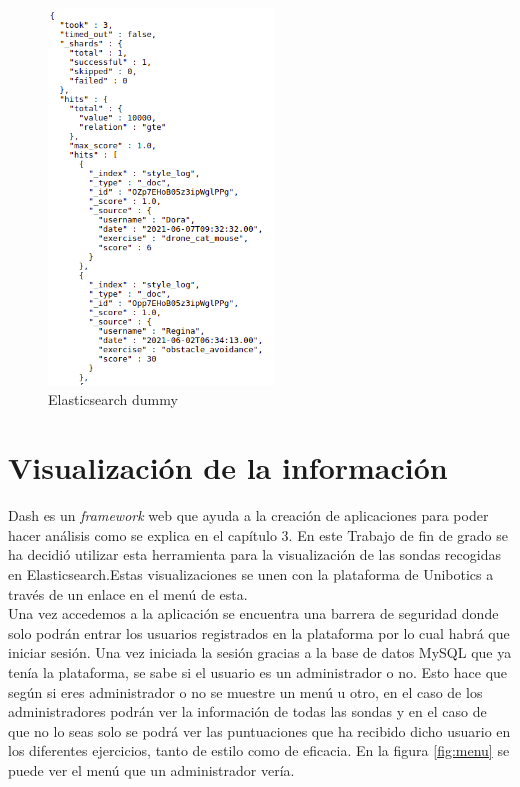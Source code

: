 \begin{figure}[H]
    \centering
    \includegraphics[width=6cm, keepaspectratio]{img/dummy.png}
    \caption{Elasticsearch dummy}
    \label{fig:dummy}
\end{figure}

\section{Visualización de la información}

Dash es un \textit{framework} web que ayuda a la creación de aplicaciones para poder hacer análisis como se explica en el capítulo 3. En este Trabajo de fin de grado se ha decidió utilizar esta herramienta para la visualización de las sondas recogidas en Elasticsearch.Estas visualizaciones se unen con la plataforma de Unibotics a través de un enlace en el menú de esta.\\

Una vez accedemos a la aplicación se encuentra una barrera de seguridad donde solo podrán entrar los usuarios registrados en la plataforma por lo cual habrá que iniciar sesión. Una vez iniciada la sesión gracias a la base de datos MySQL que ya tenía la plataforma, se sabe si el usuario es un administrador o no. Esto hace que según si eres administrador o no se muestre un menú u otro, en el caso de los administradores podrán ver la información de todas las sondas y en el caso de que no lo seas solo se podrá ver las puntuaciones que ha recibido dicho usuario en los diferentes ejercicios, tanto de estilo como de eficacia. En la figura \ref{fig:menu} se puede ver el menú que un administrador vería.

